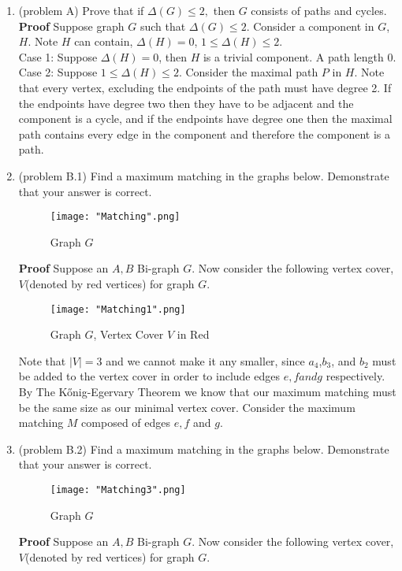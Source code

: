 \documentclass{amsart}
\begin{document}
\thispagestyle{fancy}
 
\begin{enumerate}
\item (problem A) Prove that if $\Delta(G) \leq 2,$ then $G$ consists of paths and cycles.\\

\textbf{Proof} Suppose graph $G$ such that $\Delta(G) \leq 2$. Consider a component in $G$, $H$. Note $H$ can contain, $\Delta(H) = 0$, $1 \leq \Delta(H) \leq 2$.\\
Case 1: Suppose $\Delta(H) = 0$, then $H$ is a trivial component. A path length 0.\\
Case 2: Suppose $1 \leq \Delta(H) \leq 2$. Consider the maximal path $P$ in $H$. Note that every vertex, excluding the endpoints of the path must have degree 2. If the endpoints have degree two then they have to be adjacent and the component is a cycle, and if the endpoints have degree one then the maximal path contains every edge in the component and therefore the component is a path.\\

\vspace{1.5in} 

\item (problem B.1) Find a maximum matching in the graphs below. Demonstrate that your answer is correct.
\begin{figure}[H]
\caption{Graph $G$}
\centering
\texttt{[image: "Matching".png]}
\end{figure}

\textbf{Proof} Suppose an $A,B$ Bi-graph $G$. Now consider the following vertex cover, $V$(denoted by red vertices) for graph $G$. 
\begin{figure}[H]
\caption{Graph $G$, Vertex Cover $V$ in Red}
\centering
\texttt{[image: "Matching1".png]}
\end{figure}
Note that $|V| = 3$ and we cannot make it any smaller, since $a_4$,$b_3$, and $b_2$ must be added to the vertex cover in order to include edges $e, f and g$ respectively. By The Kőnig-Egervary Theorem we know that our maximum matching must be the same size as our minimal vertex cover. Consider the maximum matching $M$ composed of edges $e, f$ and $g$.
\vspace{1in}


\item (problem B.2) Find a maximum matching in the graphs below. Demonstrate that your answer is correct.\\
\begin{figure}[H]
\caption{Graph $G$}
\centering
\texttt{[image: "Matching3".png]}
\end{figure}
\textbf{Proof} Suppose an $A,B$ Bi-graph $G$. Now consider the following vertex cover, $V$(denoted by red vertices) for graph $G$.


\end{enumerate}
\end{document}
